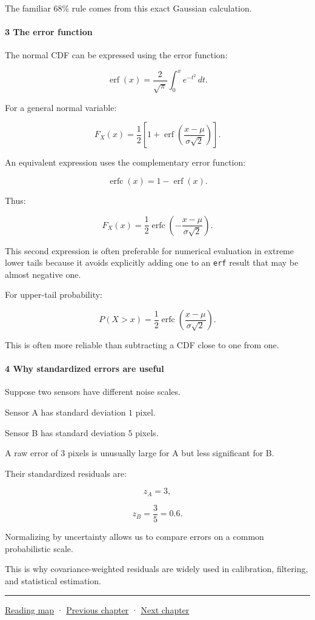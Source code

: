 The familiar 68\% rule comes from this exact Gaussian calculation.

\paragraph{3 The error function}\label{the-error-function}

The normal CDF can be expressed using the error function:

\[
 \operatorname{erf}(x)= \frac2{\sqrt\pi} \int_0^xe^{-t^2}\,dt.
\]

For a general normal variable:

\[
 \boxed{ F_X(x) = \frac12\left[ 1+\operatorname{erf} \left(\frac{x-\mu}{\sigma\sqrt2}\right) \right] }.
\]

An equivalent expression uses the complementary error function:

\[
 \operatorname{erfc}(x)=1-\operatorname{erf}(x).
\]

Thus:

\[
 \boxed{ F_X(x) = \frac12\operatorname{erfc} \left( -\frac{x-\mu}{\sigma\sqrt2} \right) }.
\]

This second expression is often preferable for numerical evaluation in extreme lower tails because it avoids explicitly adding one to an \texttt{erf} result that may be almost negative one.

For upper-tail probability:

\[
 P(X>x) = \frac12\operatorname{erfc} \left( \frac{x-\mu}{\sigma\sqrt2} \right).
\]

This is often more reliable than subtracting a CDF close to one from one.

\paragraph{4 Why standardized errors are useful}\label{why-standardized-errors-are-useful}

Suppose two sensors have different noise scales.

Sensor A has standard deviation \(1\) pixel.

Sensor B has standard deviation \(5\) pixels.

A raw error of \(3\) pixels is unusually large for A but less significant for B.

Their standardized residuals are:

\[
 z_A=3,
\]

\[
 z_B=\frac35=0.6.
\]

Normalizing by uncertainty allows us to compare errors on a common probabilistic scale.

This is why covariance-weighted residuals are widely used in calibration, filtering, and statistical estimation.

\begin{center}\rule{0.5\linewidth}{0.5pt}\end{center}

\href{Chapter\%20Edition/01\%20-\%20Computing\%20Foundations/00\%20-\%20Reading\%20Map}{Reading map} · \hyperref[02-foundations-ii-ch022]{Previous chapter} · \hyperref[02-foundations-ii-ch024]{Next chapter}
